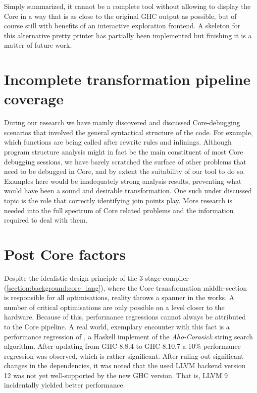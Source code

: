 Simply summarized, it cannot be a complete tool without allowing to display the  Core in a way that is as close to the original 
GHC output as possible, but of course still with benefits of an interactive exploration frontend. A skeleton for this alternative
pretty printer has partially been implemented but finishing it is a matter of future work.

\section{Incomplete transformation pipeline coverage}

During our research we have mainly discovered and discussed Core-debugging scenarios that involved the general syntactical structure of the code.
For example, which functions are being called after rewrite rules and inlinings.
Although program structure analysis might in fact be the main constituent of most Core
debugging sessions, we have barely scratched the surface of other problems that need to be debugged in Core,
and by extent the suitability of our tool to do so. Examples here would be inadequately strong analysis results, preventing what would have been
a sound and desirable transformation. One such under discussed topic is the role that correctly identifying join points play.
More research is needed into the full spectrum of Core related problems and the information required to deal with them.

\section{Post Core factors}

Despite the idealistic design principle of the 3 stage compiler (\cref{section:background:core_lang}), where the Core transformation middle-section
is responsible for all optimisations, reality throws a spanner in the works. A number of critical optimisations are only possible on
a level closer to the hardware. Because of this, performance regressions cannot always be attributed to the Core pipeline. A real world, exemplary
encounter with this fact is a performance regression of  \cite{alfred-margaret}, a Haskell implement of the \textit {Aho-Corasick}
string search algorithm. After updating from GHC 8.8.4 to GHC 8.10.7 a 10$\%$ performance regression was observed, which is rather significant.
After ruling out significant changes in the dependencies, it was noted that the used LLVM backend version 12 was not yet well-supported by the new GHC
version. That is, LLVM 9 incidentally yielded better performance.

